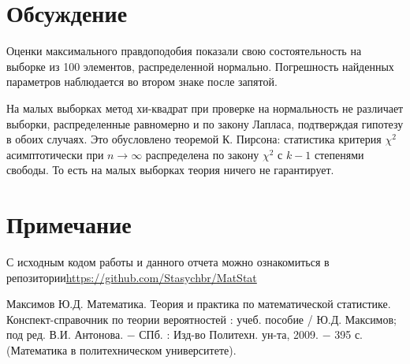 \documentclass[a4paper,12pt]{article} %
\begin{document}
\section{Обсуждение}
Оценки максимального правдоподобия показали свою состоятельность на выборке из 100 элементов, распределенной нормально. Погрешность найденных параметров наблюдается во втором знаке после запятой.

На малых выборках метод хи-квадрат при проверке на нормальность не различает выборки, распределенные равномерно и по закону Лапласа, подтверждая гипотезу в обоих случаях. Это обусловлено теоремой К. Пирсона: статистика критерия $\chi^2$ асимптотически при $n\rightarrow\infty$ распределена по закону $\chi^2$ с $k-1$ степенями свободы. То есть на малых выборках теория ничего не гарантирует.
\section*{Примечание}
С исходным кодом работы и данного отчета можно ознакомиться в репозитории\;\url{https://github.com/Stasychbr/MatStat}
\newpage
\begin{thebibliography}{9}
 Максимов Ю.Д. Математика. Теория и практика по математической статистике. Конспект-справочник по теории вероятностей : учеб. пособие /
Ю.Д. Максимов; под ред. В.И. Антонова. $-$ СПб. : Изд-во Политехн.
ун-та, 2009. $-$ 395 с. (Математика в политехническом университете).
\end{thebibliography}
\end{document}
